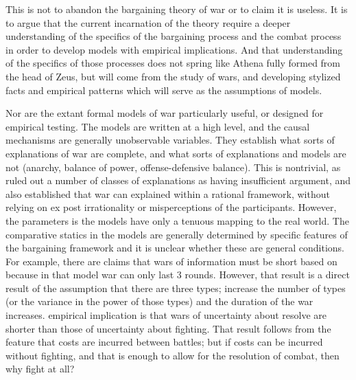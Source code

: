 This is not to abandon the bargaining theory of war or to claim it is useless.
It is to argue that the current incarnation of the theory require a deeper understanding of the specifics of the bargaining process and the combat process in order to develop models with empirical implications.
And that understanding of the specifics of those processes does not spring like Athena fully formed from the head of Zeus, but will come from the study of wars, and developing stylized facts and empirical patterns which will serve as the assumptions of models.

Nor are the extant formal models of war particularly useful, or designed for empirical testing. %
The models are written at a high level, and the causal mechanisms are generally unobservable variables. %
They establish what sorts of explanations of war are complete, and what sorts of explanations and models are not (anarchy, balance of power, offense-defensive balance).
This is nontrivial, as \textcite{Fearon1995} ruled out a number of classes of explanations as having insufficient argument, and also established that war can explained within a rational framework, without relying on ex post irrationality or misperceptions of the participants.
However, the parameters is the models have only a tenuous mapping to the real world. %
The comparative statics in the models are generally determined by specific features of the bargaining framework and it is unclear whether these are general conditions. %
For example, there are claims that wars of information must be short based on \textcite{Slantchev2003} because in that model war can only last 3 rounds. %
However, that result is a direct result of the assumption that there are three types; increase the number of types (or the variance in the power of those types) and the duration of the war increases. %
\textcite{Powell2004} empirical implication is that wars of uncertainty about resolve are shorter than those of uncertainty about fighting. %
That result follows from the feature that costs are incurred between battles; but if costs can be incurred without fighting, and that is enough to allow for the resolution of combat, then why fight at all?

